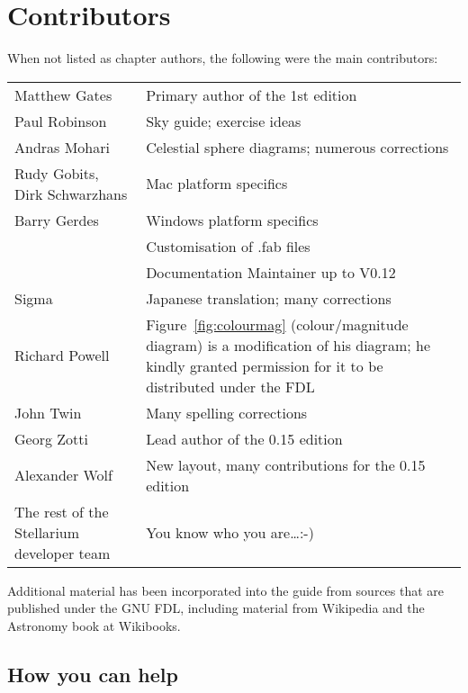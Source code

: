 
\chapter{Contributors}

When not listed as chapter authors, the following were the main contributors:
\begin{longtabu} to \textwidth {l|X}
\toprule
Matthew Gates & Primary author of the 1st edition\\
Paul Robinson &Sky guide; exercise ideas\\
Andras Mohari &Celestial sphere diagrams; numerous corrections\\
Rudy Gobits, Dirk Schwarzhans & Mac platform specifics\\
Barry Gerdes&Windows platform specifics \\
            &Customisation of .fab files\\
            &Documentation Maintainer up to V0.12\\
Sigma       &Japanese translation; many corrections\\ %
Richard Powell& Figure~\ref{fig:colourmag} (colour/magnitude diagram) is a modification of his diagram; he kindly granted permission for it to be distributed under the FDL\\
John Twin & Many spelling corrections \\
Georg Zotti & Lead author of the 0.15 edition\\
Alexander Wolf & New layout, many contributions for the 0.15 edition\\
The rest of the Stellarium developer team & You know who you are\ldots :-)\tabularnewline
\bottomrule
\end{longtabu}


Additional material has been incorporated into the guide from sources
that are published under the GNU FDL, including material from Wikipedia
and the Astronomy book at Wikibooks.

\section{How you can help}
\label{sec:HowYouCanHelp}

